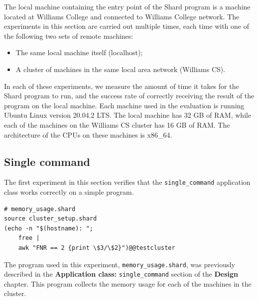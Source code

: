 \documentclass[oneside]{report}
\newcommand{\todoi}[1]{\todo[inline, color=blue!20]{TODO: {#1}}}
\begin{document}
The local machine containing the entry point of the Shard program is a machine located at Williams College and connected to Williams College network.
The experiments in this section are carried out multiple times, each time with one of the following two sets of remote machines:
\begin{itemize}
  \item The same local machine itself (localhost);
  \item A cluster of machines in the same local area network (Williams CS).
\end{itemize}
In each of these experiments, we measure the amount of time it takes for the Shard program to run, and the success rate of correctly receiving the result of the program on the local machine.
Each machine used in the evaluation is running Ubuntu Linux version 20.04.2 LTS.
The local machine has 32 GB of RAM, while each of the machines on the Williams CS cluster has 16 GB of RAM.
The architecture of the CPUs on these machines is x86\_64.


\subsection{Single command}
\begin{sloppypar}
  The first experiment in this section verifies that the \texttt{single\_command} application class works correctly on a simple program.
\end{sloppypar}

\begin{minipage}[c]{\textwidth-15pt}
  \begin{lstlisting}[language=Shard]
# memory_usage.shard
source cluster_setup.shard
(echo -n "$(hostname): ";
    free |
    awk "FNR == 2 {print \$3/\$2}")@@testcluster
\end{lstlisting}
  \smallskip
\end{minipage}

The program used in this experiment, \texttt{memory\_usage.shard}, was previously described in the \textbf{Application class: }\texttt{single\_command} section of the \textbf{Design} chapter.
This program collects the memory usage for each of the machines in the cluster.
\end{document}
